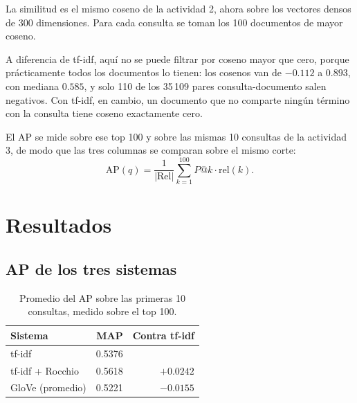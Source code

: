 \documentclass[11pt,letterpaper]{article}
\begin{document}
La similitud es el mismo coseno de la actividad 2, ahora sobre los
vectores densos de 300 dimensiones. Para cada consulta se toman los
100 documentos de mayor coseno.

A diferencia de tf-idf, aquí no se puede filtrar por coseno mayor que
cero, porque prácticamente todos los documentos lo tienen: los
cosenos van de $-0.112$ a $0.893$, con mediana $0.585$, y solo 110 de
los 35\,109 pares consulta-documento salen negativos. Con tf-idf, en
cambio, un documento que no comparte ningún término con la consulta
tiene coseno exactamente cero.

El AP se mide sobre ese top 100 y sobre las mismas 10 consultas de la
actividad 3, de modo que las tres columnas se comparan sobre el mismo
corte:
\[
    \mathrm{AP}(q) = \frac{1}{|\mathrm{Rel}|} \sum_{k=1}^{100}
                     P@k \cdot \mathrm{rel}(k) .
\]

\section{Resultados}

\subsection*{AP de los tres sistemas}

\begin{table}[H]
  \centering
  \begin{tabular}{lrr}
    \toprule
    \textbf{Sistema} & \textbf{MAP} & \textbf{Contra tf-idf} \\
    \midrule
    tf-idf              & 0.5376 &            \\
    tf-idf + Rocchio    & 0.5618 & $+0.0242$  \\
    GloVe (promedio)    & 0.5221 & $-0.0155$  \\
    \bottomrule
  \end{tabular}
  \caption{Promedio del AP sobre las primeras 10 consultas, medido
    sobre el top 100.}
  \label{tab:map}
\end{table}
\end{document}
